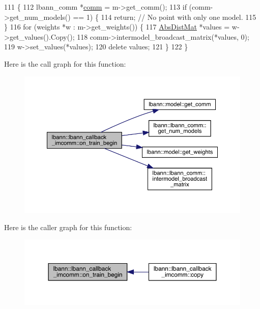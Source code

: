 \begin{DoxyCode}
111                                                    \{
112   lbann\_comm *\hyperlink{file__io_8cpp_ab048c6f9fcbcfaa57ce68b00263dbebe}{comm} = m->get\_comm();
113   \textcolor{keywordflow}{if} (comm->get\_num\_models() == 1) \{
114     \textcolor{keywordflow}{return};  \textcolor{comment}{// No point with only one model.}
115   \}
116   \textcolor{keywordflow}{for} (weights *w : m->get\_weights()) \{
117     \hyperlink{base_8hpp_a9a697a504ae84010e7439ffec862b470}{AbsDistMat} *values = w->get\_values().Copy();
118     comm->intermodel\_broadcast\_matrix(*values, 0);
119     w->set\_values(*values);
120     \textcolor{keyword}{delete} values;
121   \}
122 \}
\end{DoxyCode}
Here is the call graph for this function\+:\nopagebreak
\begin{figure}[H]
\begin{center}
\leavevmode
\includegraphics[width=350pt]{classlbann_1_1lbann__callback__imcomm_a332ba4ceca91939c79fae2735fdc8ff3_cgraph}
\end{center}
\end{figure}
Here is the caller graph for this function\+:\nopagebreak
\begin{figure}[H]
\begin{center}
\leavevmode
\includegraphics[width=350pt]{classlbann_1_1lbann__callback__imcomm_a332ba4ceca91939c79fae2735fdc8ff3_icgraph}
\end{center}
\end{figure}
\mbox{\label{classlbann_1_1lbann__callback__imcomm_a01ee7aaa808987e1f7fcca0e85cc1f73}} 
